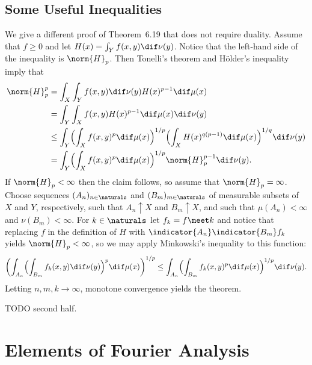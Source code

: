 \documentclass[article, a4paper, 11pt, oneside]{memoir}
\numberwithin{equation}{chapter}
\theoremstyle{nonumberplain}
\begin{document}
\addtocounter{section}{1}
\section{Some Useful Inequalities}

\begin{remarkbreak}
	We give a different proof of Theorem~6.19 that does not require duality. Assume that $f \geq 0$ and let $H(x) = \int_Y f(x,y) \dif\nu(y)$. Notice that the left-hand side of the inequality is $\norm{H}_p$. Then Tonelli's theorem and Hölder's inequality imply that
	\begin{align*}
		\norm{H}_p^p
			&= \int_X \int_Y f(x,y) \dif\nu(y) H(x)^{p-1} \dif\mu(x) \\
			&= \int_Y \int_X f(x,y) H(x)^{p-1} \dif\mu(x) \dif\nu(y) \\
			&\leq \int_Y \Bigl( \int_X f(x,y)^p \dif\mu(x) \Bigr)^{1/p} \Bigl( \int_X H(x)^{q(p-1)} \dif\mu(x) \Bigr)^{1/q} \dif\nu(y) \\
			&= \int_Y \Bigl( \int_X f(x,y)^p \dif\mu(x) \Bigr)^{1/p} \norm{H}_p^{p-1} \dif\nu(y).
	\end{align*}
	If $\norm{H}_p < \infty$ then the claim follows, so assume that $\norm{H}_p = \infty$. Choose sequences $(A_n)_{n \in \naturals}$ and $(B_m)_{m \in \naturals}$ of measurable subsets of $X$ and $Y$, respectively, such that $A_n \uparrow X$ and $B_m \uparrow X$, and such that $\mu(A_n) < \infty$ and $\nu(B_m) < \infty$. For $k \in \naturals$ let $f_k = f \meet k$ and notice that replacing $f$ in the definition of $H$ with $\indicator{A_n} \indicator{B_m} f_k$ yields $\norm{H}_p < \infty$, so we may apply Minkowski's inequality to this function:
	\begin{equation*}
		\biggl( \int_{A_n} \Bigl( \int_{B_m} f_k(x,y) \dif\nu(y) \Bigr)^p \dif\mu(x) \biggr)^{1/p}
			\leq \int_{A_n} \Bigl( \int_{B_m} f_k(x,y)^p \dif\mu(x) \Bigr)^{1/p} \dif\nu(y).
	\end{equation*}
	Letting $n,m,k \to \infty$, monotone convergence yields the theorem.

	TODO second half.
\end{remarkbreak}



\addtocounter{chapter}{1}
\chapter{Elements of Fourier Analysis}
\end{document}
